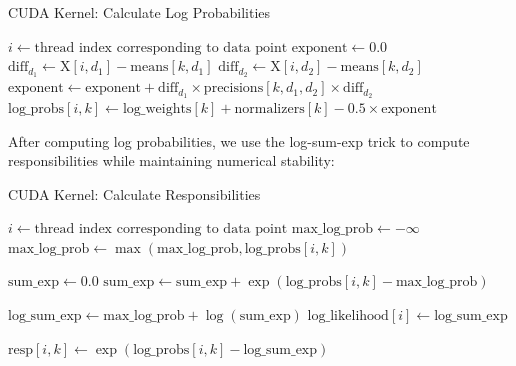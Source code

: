 \documentclass[conference]{IEEEtran}
\begin{document}
\begin{algorithm}
\caption{CUDA Kernel: Calculate Log Probabilities}
\begin{algorithmic}[1]
\STATE $i \gets \textrm{thread index corresponding to data point}$
        \STATE $\textrm{exponent} \gets 0.0$
            \STATE $\textrm{diff}_{d_1} \gets \textrm{X}[i, d_1] - \textrm{means}[k, d_1]$
                \STATE $\textrm{diff}_{d_2} \gets \textrm{X}[i, d_2] - \textrm{means}[k, d_2]$
                \STATE $\textrm{exponent} \gets \textrm{exponent} + \textrm{diff}_{d_1} \times \textrm{precisions}[k, d_1, d_2] \times \textrm{diff}_{d_2}$
            \ENDFOR
        \ENDFOR
        \STATE $\textrm{log\_probs}[i, k] \gets \textrm{log\_weights}[k] + \textrm{normalizers}[k] - 0.5 \times \textrm{exponent}$
    \ENDFOR
\ENDIF
\end{algorithmic}
\end{algorithm}

After computing log probabilities, we use the log-sum-exp trick to compute responsibilities while maintaining numerical stability:

\begin{algorithm}
\caption{CUDA Kernel: Calculate Responsibilities}
\begin{algorithmic}[1]
\STATE $i \gets \textrm{thread index corresponding to data point}$
    \STATE $\textrm{max\_log\_prob} \gets -\infty$ 
        \STATE $\textrm{max\_log\_prob} \gets \max(\textrm{max\_log\_prob}, \textrm{log\_probs}[i, k])$
    \ENDFOR
    
    \STATE $\textrm{sum\_exp} \gets 0.0$
        \STATE $\textrm{sum\_exp} \gets \textrm{sum\_exp} + \exp(\textrm{log\_probs}[i, k] - \textrm{max\_log\_prob})$
    \ENDFOR
    
    \STATE $\textrm{log\_sum\_exp} \gets \textrm{max\_log\_prob} + \log(\textrm{sum\_exp})$
    \STATE $\textrm{log\_likelihood}[i] \gets \textrm{log\_sum\_exp}$ 
    
        \STATE $\textrm{resp}[i, k] \gets \exp(\textrm{log\_probs}[i, k] - \textrm{log\_sum\_exp})$
    \ENDFOR
\ENDIF
\end{algorithmic}
\end{algorithm}
\end{document}
